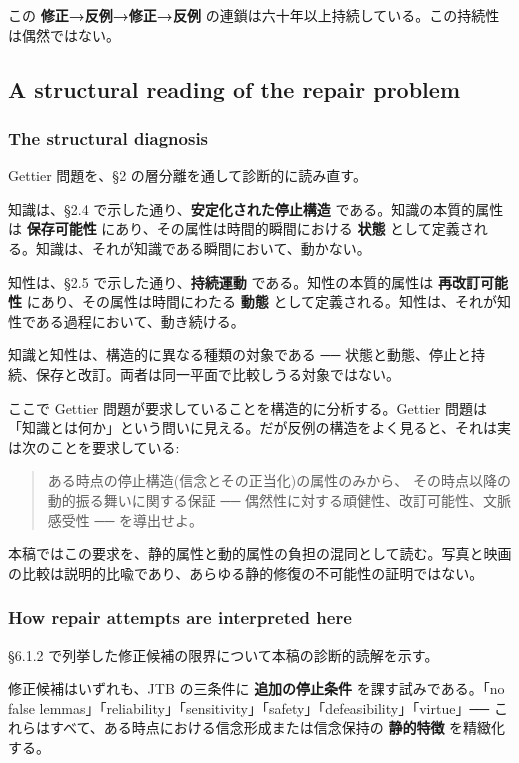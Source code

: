 この \textbf{修正→反例→修正→反例} の連鎖は六十年以上持続している。この持続性は偶然ではない。

\subsection{A structural reading of the repair problem}


\subsubsection{The structural diagnosis}


Gettier 問題を、\S{}2 の層分離を通して診断的に読み直す。

知識は、\S{}2.4 で示した通り、\textbf{安定化された停止構造} である。知識の本質的属性は \textbf{保存可能性} にあり、その属性は時間的瞬間における \textbf{状態} として定義される。知識は、それが知識である瞬間において、動かない。

知性は、\S{}2.5 で示した通り、\textbf{持続運動} である。知性の本質的属性は \textbf{再改訂可能性} にあり、その属性は時間にわたる \textbf{動態} として定義される。知性は、それが知性である過程において、動き続ける。

知識と知性は、構造的に異なる種類の対象である ── 状態と動態、停止と持続、保存と改訂。両者は同一平面で比較しうる対象ではない。

ここで Gettier 問題が要求していることを構造的に分析する。Gettier 問題は「知識とは何か」という問いに見える。だが反例の構造をよく見ると、それは実は次のことを要求している:

\begin{quote}
ある時点の停止構造(信念とその正当化)の属性のみから、
その時点以降の動的振る舞いに関する保証 ── 偶然性に対する頑健性、改訂可能性、文脈感受性 ── を導出せよ。
\end{quote}

本稿ではこの要求を、静的属性と動的属性の負担の混同として読む。写真と映画の比較は説明的比喩であり、あらゆる静的修復の不可能性の証明ではない。

\subsubsection{How repair attempts are interpreted here}


\S{}6.1.2 で列挙した修正候補の限界について本稿の診断的読解を示す。

修正候補はいずれも、JTB の三条件に \textbf{追加の停止条件} を課す試みである。「no false lemmas」「reliability」「sensitivity」「safety」「defeasibility」「virtue」── これらはすべて、ある時点における信念形成または信念保持の \textbf{静的特徴} を精緻化する。

